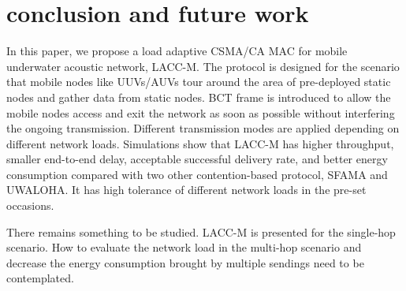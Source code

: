 \documentclass[conference]{IEEEtran}
\begin{document}
\section{conclusion and future work}
In this paper, we propose a load adaptive CSMA/CA MAC for mobile underwater acoustic network, LACC-M. The protocol is designed for the scenario that mobile nodes like UUVs/AUVs tour around the area of pre-deployed static nodes and gather data from static nodes. BCT frame is introduced to allow the mobile nodes access and exit the network as soon as possible without interfering the ongoing
transmission. Different transmission modes are applied depending on different network loads. Simulations show that LACC-M has higher
throughput, smaller end-to-end delay, acceptable successful delivery rate, and better energy consumption compared with two other contention-based protocol, SFAMA and UWALOHA. It has high tolerance of different network loads in the pre-set occasions.

There remains something to be studied. LACC-M is
presented for the single-hop scenario. How to evaluate the network load in the multi-hop scenario and decrease the energy consumption brought by multiple sendings need to be contemplated.



\end{document}
